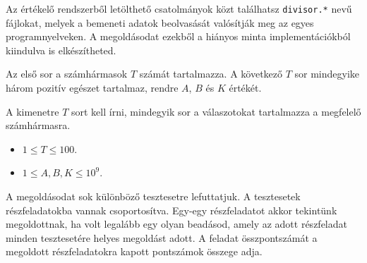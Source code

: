 \begin{warning}
Az értékelő rendszerből letölthető csatolmányok közt találhatsz
\texttt{divisor.*} nevű fájlokat, melyek a bemeneti adatok beolvasását valósítják meg az egyes programnyelveken.
A megoldásodat ezekből a hiányos minta implementációkból kiindulva is elkészítheted.
\end{warning}

\InputFile

Az első sor a számhármasok $T$ számát tartalmazza. A következő $T$ sor mindegyike három pozitív egészet tartalmaz, rendre $A$, $B$ és $K$ értékét.

\OutputFile

A kimenetre $T$ sort kell írni, mindegyik sor a válaszotokat tartalmazza a megfelelő számhármasra.

\Constraints
\begin{itemize}[nolistsep, itemsep=2mm]
	\item $1 \le T \le 100$.
	\item $1 \le A, B, K \le 10^9$.
\end{itemize}

\Scoring
A megoldásodat sok különböző tesztesetre lefuttatjuk. A tesztesetek részfeladatokba vannak csoportosítva. Egy-egy részfeladatot akkor tekintünk megoldottnak, ha volt legalább egy olyan beadásod, amely az adott részfeladat minden tesztesetére helyes megoldást adott.
A feladat összpontszámát a megoldott részfeladatokra kapott pontszámok összege adja.





\Examples
\begin{example}
%
\end{example}


